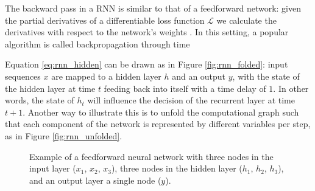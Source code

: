 \documentclass[a4paper]{book}
\begin{document}
The backward pass in a RNN is similar to that of a feedforward network: given the partial derivatives of a differentiable loss function $\mathcal{L}$ we calculate the derivatives with respect to the network's weights \parencite{graves_supervised_2012}. In this setting, a popular algorithm is called backpropagation through time 

Equation \ref{eq:rnn_hidden} can be drawn as in Figure \ref{fig:rnn_folded}: input sequences $x$ are mapped to a hidden layer $h$ and an output $y$, with the state of the hidden layer at time $t$ feeding back into itself with a time delay of $1$. In other words, the state of $h_t$ will influence the decision of the recurrent layer at time $t+1$. Another way to illustrate this is to unfold the computational graph such that each component of the network is represented by different variables per step, as in Figure \ref{fig:rnn_unfolded}.

\begin{figure}[t]
    \centering
    \caption{Example of a feedforward neural network with three nodes in the input layer ($x_1$, $x_2$, $x_3$), three nodes in the hidden layer ($h_1$, $h_2$, $h_3$), and an output layer a single node ($y$).}
    \label{fig:feedforward_net}
\end{figure}
\end{document}
